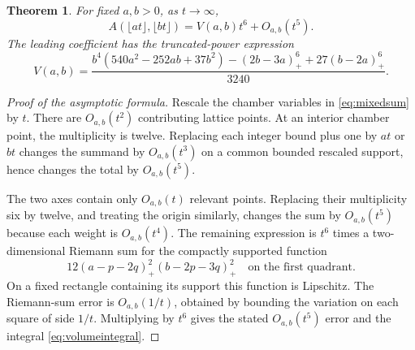 \documentclass[11pt]{article}
\numberwithin{equation}{section}
\newtheorem{theorem}{Theorem}[section]
\theoremstyle{definition}
\begin{document}
\begin{theorem}\label{thm:volume}
For fixed $a,b>0$, as $t\to\infty$,
\begin{equation}\label{eq:anisotropicasymptotic}
 A(\lfloor at\rfloor,\lfloor bt\rfloor)
 =V(a,b)t^6+O_{a,b}(t^5).
\end{equation}
The leading coefficient has the truncated-power expression
\begin{equation}\label{eq:volumetruncated}
 \boxed{\displaystyle
 V(a,b)=\frac{b^4(540a^2-252ab+37b^2)
 -(2b-3a)_+^6+27(b-2a)_+^6}{3240}.}
\end{equation}
\end{theorem}

\begin{proof}[Proof of the asymptotic formula]
Rescale the chamber variables in \eqref{eq:mixedsum} by $t$. There are
$O_{a,b}(t^2)$ contributing lattice points. At an interior chamber point,
the multiplicity is twelve. Replacing each integer bound plus one by $at$
or $bt$ changes the summand by $O_{a,b}(t^3)$ on a common bounded rescaled
support, hence changes the total by $O_{a,b}(t^5)$.

The two axes contain only $O_{a,b}(t)$ relevant points. Replacing their
multiplicity six by twelve, and treating the origin similarly, changes the
sum by $O_{a,b}(t^5)$ because each weight is $O_{a,b}(t^4)$. The remaining
expression is $t^6$ times a two-dimensional Riemann sum for the compactly
supported function
\[
 12(a-p-2q)_+^2(b-2p-3q)_+^2
 \quad\text{on the first quadrant}.
\]
On a fixed rectangle containing its support this function is Lipschitz.
The Riemann-sum error is $O_{a,b}(1/t)$, obtained by bounding the variation
on each square of side $1/t$. Multiplying by $t^6$ gives the stated
$O_{a,b}(t^5)$ error and the integral \eqref{eq:volumeintegral}.
\end{proof}
\end{document}
